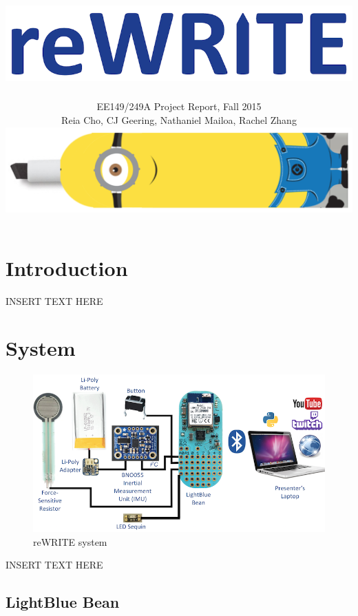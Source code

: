 \documentclass[10pt,journal]{IEEEtran}
\begin{document}
\title{\includegraphics[width=0.4\linewidth]{figures/rewrite}}

\author{EE149/249A Project Report, Fall 2015

Reia Cho, CJ Geering, Nathaniel Mailoa, Rachel Zhang

\includegraphics[width=0.45\linewidth]{figures/minion}}


\maketitle


\section{Introduction}
INSERT TEXT HERE

\section{System}

\begin{figure}[H]
    \includegraphics[width=\linewidth]{figures/system}
  \caption{reWRITE system}
  \label{fig:system}
\end{figure}

INSERT TEXT HERE

\subsection{LightBlue Bean}
\end{document}
